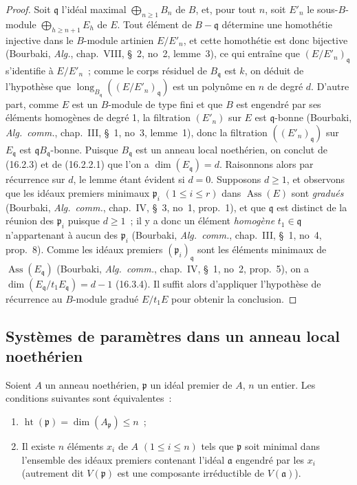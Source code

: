 \begin{proof}
Soit $\mathfrak{q}$ l'idéal maximal $\bigoplus_{n\geq1}B_n$ de $B$, et, pour
tout $n$, soit $E'_n$ le sous-$B$-module $\bigoplus_{h\geq n+1}E_h$ de $E$.
Tout élément de $B-\mathfrak{q}$ détermine une homothétie injective dans le
$B$-module artinien $E/E'_n$, et cette homothétie est donc bijective
(Bourbaki, \emph{Alg.}, chap.~VIII, \S~2, no~2, lemme~3), ce qui entraîne que
$(E/E'_n)_{\mathfrak{q}}$ s'identifie à $E/E'_n$~; comme le corps résiduel de
$B_{\mathfrak{q}}$ est $k$, on déduit de l'hypothèse que
$\operatorname{long}_{B_{\mathfrak{q}}}((E/E'_n)_{\mathfrak{q}})$ est un
polynôme en $n$ de degré $d$. D'autre part, comme $E$ est un $B$-module de
type fini et que $B$ est engendré par ses éléments homogènes de degré 1, la
filtration $(E'_n)$ sur $E$ est $\mathfrak{q}$-bonne (Bourbaki,
\emph{Alg.~comm.}, chap.~III, \S~1, no~3, lemme~1), donc la filtration
$((E'_n)_{\mathfrak{q}})$ sur $E_{\mathfrak{q}}$ est
$\mathfrak{q}B_{\mathfrak{q}}$-bonne. Puisque $B_{\mathfrak{q}}$ est un anneau
local noethérien, on conclut de (16.2.3) et de (16.2.2.1) que l'on a
$\dim(E_{\mathfrak{q}})=d$. Raisonnons alors par récurrence sur $d$, le lemme
étant évident si $d=0$. Supposons $d\geq1$, et observons que les idéaux premiers
minimaux $\mathfrak{p}_i$ $(1\leq i\leq r)$ dans
$\operatorname{Ass}(E)$ sont \emph{gradués} (Bourbaki, \emph{Alg.~comm.},
chap.~IV, \S~3, no~1, prop.~1), et que $\mathfrak{q}$ est distinct de la
réunion des $\mathfrak{p}_i$ puisque $d\geq1$~; il y a donc un élément
\emph{homogène} $t_1\in\mathfrak{q}$ n'appartenant à aucun des
$\mathfrak{p}_i$ (Bourbaki, \emph{Alg.~comm.}, chap.~III, \S~1, no~4,
prop.~8). Comme les idéaux premiers $(\mathfrak{p}_i)_{\mathfrak{q}}$ sont les
éléments minimaux de $\operatorname{Ass}(E_{\mathfrak{q}})$ (Bourbaki,
\emph{Alg.~comm.}, chap.~IV, \S~1, no~2, prop.~5), on a
$\dim(E_{\mathfrak{q}}/t_1E_{\mathfrak{q}})=d-1$ (16.3.4). Il suffit alors
d'appliquer l'hypothèse de récurrence au $B$-module gradué $E/t_1E$ pour
obtenir la conclusion.
\end{proof}

\subsection{Systèmes de paramètres dans un anneau local noethérien}
\label{subsection:0.16.3-fr}

\begin{proposition}[16.3.1]
\label{0.16.3.1-fr}
Soient $A$ un anneau noethérien, $\mathfrak{p}$ un idéal premier de $A$, $n$ un
entier. Les conditions suivantes sont équivalentes~:
\begin{enumerate}
  \item[$a)$] $\operatorname{ht}(\mathfrak{p})=
  \dim(A_{\mathfrak{p}})\leq n$~;
  \item[$b)$] Il existe $n$ éléments $x_i$ de $A$ $(1\leq i\leq n)$ tels que
  $\mathfrak{p}$ soit minimal dans l'ensemble des idéaux premiers contenant
  l'idéal $\mathfrak{a}$ engendré par les $x_i$ (autrement dit
  $V(\mathfrak{p})$ est une composante irréductible de $V(\mathfrak{a})$).
\end{enumerate}
\end{proposition}

